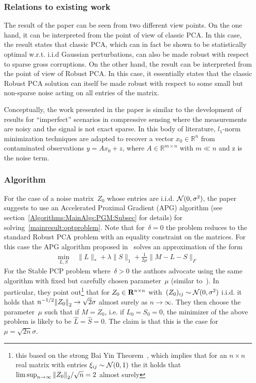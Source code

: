\subsubsection{Relations to existing work}

The result of the paper can be seen from two different view points. On the one hand, it can be interpreted from the point of view of classic PCA. In this case, the result states that classic PCA, which can in fact be shown to be statistically optimal w.r.t. i.i.d Gaussian perturbations, can also be made robust with respect to sparse gross corruptions. On the other hand, the result can be interpreted from the point of view of Robust PCA. In this case, it essentially states that the classic Robust PCA solution can itself be made robust with respect to some small but non-sparse noise acting on all entries of the matrix.

Conceptually, the work presented in the paper is similar to the development of results for ``imperfect'' scenarios in compressive sensing where the measurements are noisy and the signal is not exact sparse. In this body of literature, $l_1$-norm minimization techniques are adapted to recover a vector $x_0 \in \mathbb{R}^n$ from contaminated observations $y=Ax_0+z$, where $A \in \mathbb{R}^{m\times n}$ with $m \ll n$ and z is the noise term.


\subsubsection{Algorithm}

For the case of a noise matrix~$Z_0$ whose entries are i.i.d. ${\mathcal{N}}(0,\sigma^2)$, the paper suggests to use an Accelerated Proximal Gradient (APG) algorithm (see section~\ref{Algorithms:MainAlgs:PGM:Subsec} for details) for solving~\eqref{mainresult:optproblem}. Note that for~$\delta =0$ the problem reduces to the standard Robust PCA problem with an equality constraint on the matrices. For this case the APG algorithm proposed in~\cite{Lin:2009kx} solves an approximation of the form
\begin{align*}
\min_{L,S} \; &\|L\|_* + \lambda \|S\|_1 + \frac{1}{2\mu} \|M-L-S\|_F
\end{align*}
For the Stable PCP problem where~$\delta>0$ the authors advocate using the same algorithm with fixed but carefully chosen parameter~$\mu$ (similar to~\cite{Candes:2010fk}). In particular, they point out\footnote{this based on the strong Bai Yin Theorem~\cite{Bai:1988fk}, which implies that for an $n\times n$ real matrix with entries $\xi_{ij} \sim {\mathcal{N}}(0,1)$ the it holds that $\limsup_{n\rightarrow \infty} {\left\|Z_0\right\|}_{2}^{}/\sqrt{n} = 2$ almost surely}
 that for $Z_0 \in{\mathbf R}^{n\times n}$ with~$(Z_0)_{ij} \sim {\mathcal{N}}(0,\sigma^2)$ i.i.d. it holds that $n^{-1/2}{\left\|Z_0\right\|}_{2}^{} \rightarrow \sqrt{2}\sigma$ almost surely as $n\rightarrow\infty$. They then choose the parameter~$\mu$ such that if $M=Z_0$, i.e. if $L_0=S_0=0$, the minimizer of the above problem is likely to be $\hat{L}=\hat{S}=0$. The claim is that this is the case for~$\mu = \sqrt{2n}\sigma$.

